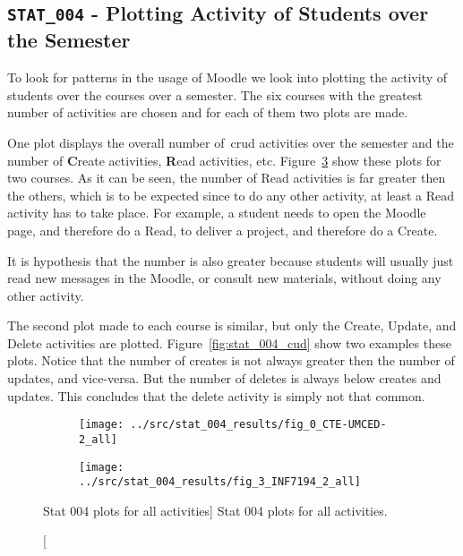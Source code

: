 \subsection{\texttt{STAT\_004} - Plotting Activity of Students over the
Semester}

To look for patterns in the usage of Moodle we look into plotting the activity
of students over the courses over a semester. The six courses with the greatest
number of activities are chosen and for each of them two plots are made.

One plot displays the overall number of~\gls{crud} activities over the semester
and the number of \textbf{C}reate activities, \textbf{R}ead activities, etc.
Figure~\ref{fig:stat_004_all} show these plots for two courses. As it can be
seen, the number of Read activities is far greater then the others, which is to
be expected since to do any other activity, at least a Read activity has to
take place. For example, a student needs to open the Moodle page, and therefore
do a Read, to deliver a project, and therefore do a Create.

It is hypothesis that the number is also greater because students will usually
just read new messages in the Moodle, or consult new materials, without doing
any other activity.

The second plot made to each course is similar, but only the Create, Update,
and Delete activities are plotted. Figure~\ref{fig:stat_004_cud} show two
examples these plots. Notice that the number of creates is not always greater
then the number of updates, and vice-versa. But the number of deletes is always
below creates and updates. This concludes that the delete activity is simply
not that common.

\begin{figure}[h!]
    \centering

    \begin{subfigure}{.5\textwidth}
        \centering
        \texttt{[image: ../src/stat\_004\_results/fig\_0\_CTE-UMCED-2\_all]}
        \label{subfig:stat_004_0_all}
    \end{subfigure}%
    \begin{subfigure}{.5\textwidth}
        \centering
        \texttt{[image: ../src/stat\_004\_results/fig\_3\_INF7194\_2\_all]}
        \label{subfig:stat_004_3_all}
    \end{subfigure}

    \caption
        [Stat 004 plots for all activities]
        {Stat 004 plots for all activities.}

    \label{fig:stat_004_all}
\end{figure}

